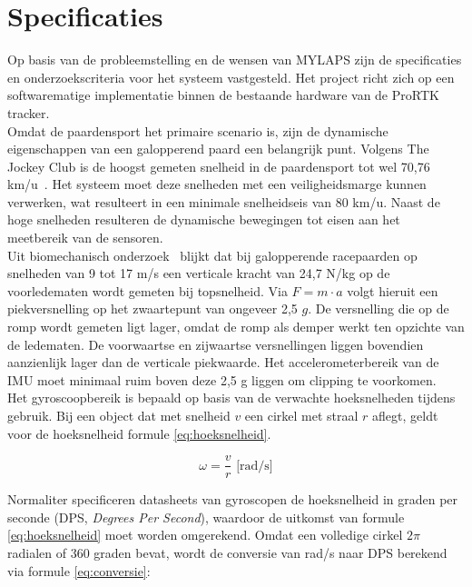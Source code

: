 \section{Specificaties}
\label{sec:specificaties}

Op basis van de probleemstelling en de wensen van MYLAPS zijn de specificaties 
en onderzoekscriteria voor het systeem vastgesteld. Het project 
richt zich op een softwarematige implementatie binnen de bestaande hardware van 
de ProRTK tracker. \\

Omdat de paardensport het primaire scenario is, zijn de dynamische eigenschappen van een galopperend paard een belangrijk punt. Volgens The Jockey Club is de hoogst gemeten snelheid in de paardensport tot wel 70,76 km/u~\cite{jockeyclub_racehorses}. Het systeem moet 
deze snelheden met een veiligheidsmarge kunnen verwerken, wat resulteert in 
een minimale snelheidseis van 80 km/u. Naast de hoge snelheden resulteren de dynamische bewegingen tot eisen aan het meetbereik van de sensoren. \\

Uit biomechanisch onderzoek~\cite{witte2006effect} blijkt dat bij 
galopperende racepaarden op snelheden van 9 tot 17 m/s een verticale kracht 
van 24,7 N/kg op de voorledematen wordt gemeten bij topsnelheid. Via 
$F = m \cdot a$ volgt hieruit een piekversnelling op het zwaartepunt van 
ongeveer 2,5 $g$. De versnelling die op de romp wordt gemeten ligt lager, omdat 
de romp als demper werkt ten opzichte van de ledematen. De voorwaartse en 
zijwaartse versnellingen liggen bovendien aanzienlijk lager dan de verticale 
piekwaarde. Het accelerometerbereik van de IMU moet minimaal ruim boven deze 
2,5 g liggen om clipping te voorkomen. \\

Het gyroscoopbereik is bepaald op basis van de verwachte hoeksnelheden tijdens gebruik. Bij een object dat met snelheid $v$ een cirkel met straal $r$ aflegt, geldt voor de hoeksnelheid formule \ref{eq:hoeksnelheid}.

\begin{equation}
    \omega = \frac{v}{r} \text{ [rad/s]}
    \label{eq:hoeksnelheid}
\end{equation}

Normaliter specificeren datasheets van gyroscopen de hoeksnelheid in graden per seconde (DPS, \textit{Degrees Per Second}), waardoor de uitkomst van formule \ref{eq:hoeksnelheid} moet worden omgerekend. Omdat een volledige cirkel $2\pi$ radialen of 360 graden bevat, wordt de conversie van rad/s naar DPS berekend via formule \ref{eq:conversie}:

